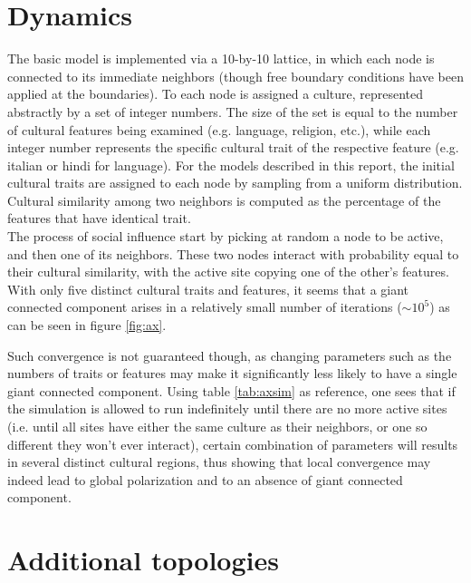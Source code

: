 \section{Dynamics}
The basic model is implemented via a 10-by-10 lattice, in which each node is connected to its immediate neighbors (though free boundary conditions have been applied at the boundaries). To each node is assigned a culture, represented abstractly by a set of integer numbers. The size of the set is equal to the number of cultural features being examined (e.g. language, religion, etc.), while each integer number represents the specific cultural trait of the respective feature (e.g. italian or hindi for language). For the models described in this report, the initial cultural traits are assigned to each node by sampling from a uniform distribution. Cultural similarity among two neighbors is computed as the percentage of the features that have identical trait. \\
The process of social influence start by picking at random a node to be active, and then one of its neighbors. These two nodes interact with probability equal to their cultural similarity, with the active site copying one of the other's features.  \\
With only five distinct cultural traits and features, it seems that a giant connected component arises in a relatively small number of iterations ($\sim 10^5$) as can be seen in figure \ref{fig:ax}.


Such convergence is not guaranteed though, as changing parameters such as the numbers of traits or features may make it significantly less likely to have a single giant connected component. Using table \ref{tab:axsim} as reference, one sees that if the simulation is allowed to run indefinitely until there are no more active sites (i.e. until all sites have either the same culture as their neighbors, or one so different they won't ever interact), certain combination of parameters will results in several distinct cultural regions, thus showing that local convergence may indeed lead to global polarization and to an absence of giant connected component. \\


\section{Additional topologies}

